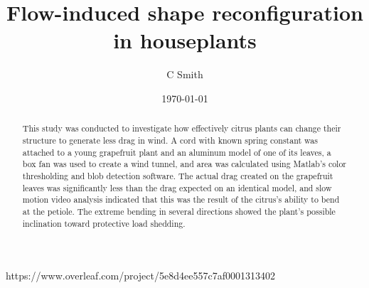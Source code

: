 \documentclass[]{article}
\title{Flow-induced shape reconfiguration in houseplants}
\author{C Smith}
\date{\today}
\begin{document}
\lstset{
  basicstyle=\ttfamily}https://www.overleaf.com/project/5e8d4ee557c7af0001313402



\maketitle
\begin{abstract}
	This study was conducted to investigate how effectively citrus plants can change their structure to generate less drag in wind. A cord with known spring constant was attached to a young grapefruit plant and an aluminum model of one of its leaves, a box fan was used to create a wind tunnel, and area was calculated using Matlab's color thresholding and blob detection software. The actual drag created on the grapefruit leaves was significantly less than the drag expected on an identical model, and slow motion video analysis indicated that this was the result of the citrus's ability to bend at the petiole. The extreme bending in several directions showed the plant's possible inclination toward protective load shedding.
    
\end{abstract}
\end{document}
